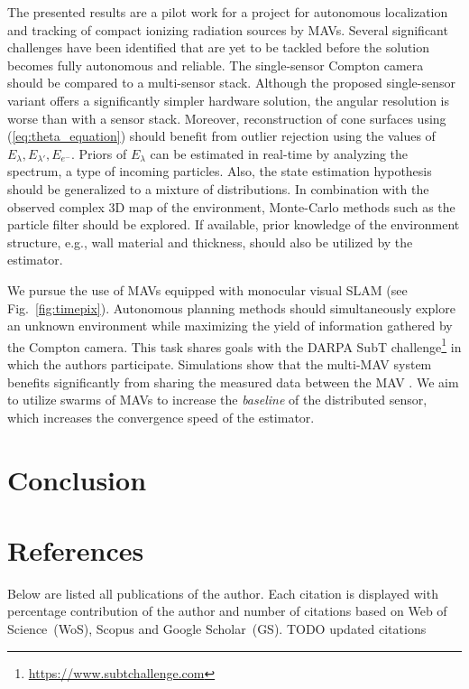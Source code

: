 \documentclass[a4paper,11pt,titlepage,twoside]{book}
\newcommand{\todo}[1]{{\color{red} TODO {#1}}}
\newcommand{\reffig}[1]{Fig.~\ref{#1}}
\newcommand{\chapternoclear}[1]{
  \begingroup
  \let\cleardoublepage\clearpage
  \chapter{#1}
  \endgroup
}
\begin{document}
  The presented results are a pilot work for a project for autonomous localization and tracking of compact ionizing radiation sources by \aclp{MAV}.
  Several significant challenges have been identified that are yet to be tackled before the solution becomes fully autonomous and reliable.
  The single-sensor Compton camera should be compared to a multi-sensor stack.
  Although the proposed single-sensor variant offers a significantly simpler hardware solution, the angular resolution is worse than with a sensor stack.
  Moreover, reconstruction of cone surfaces using (\ref{eq:theta_equation}) should benefit from outlier rejection using the values of $E_\lambda, E_{\lambda'}, E_{e^{-}}$.
  Priors of $E_\lambda$ can be estimated in real-time by analyzing the spectrum, a type of incoming particles.
  Also, the state estimation hypothesis should be generalized to a mixture of distributions.
  In combination with the observed complex 3D map of the environment, Monte-Carlo methods such as the particle filter should be explored.
  If available, prior knowledge of the environment structure, e.g., wall material and thickness, should also be utilized by the estimator.

  We pursue the use of \acp{MAV} equipped with monocular visual \ac{SLAM} (see \reffig{fig:timepix}).
  Autonomous planning methods should simultaneously explore an unknown environment while maximizing the yield of information gathered by the Compton camera.
  This task shares goals with the \ac{DARPA} SubT challenge\footnote{\url{https://www.subtchallenge.com}} in which the authors participate.
  Simulations show that the multi-\ac{MAV} system benefits significantly from sharing the measured data between the \acs{MAV} \cite{stibinger2020localization}.
  We aim to utilize swarms of \acp{MAV} to increase the \emph{baseline} of the distributed sensor, which increases the convergence speed of the estimator.





\chapternoclear{Conclusion}



\appendix
\renewcommand\chaptername{Appendix}

\chapternoclear{References}

Below are listed all publications of the author.
Each citation is displayed with percentage contribution of the author and number of citations based on Web of Science~(WoS), Scopus and Google Scholar~(GS).
\todo{updated citations}
\end{document}
